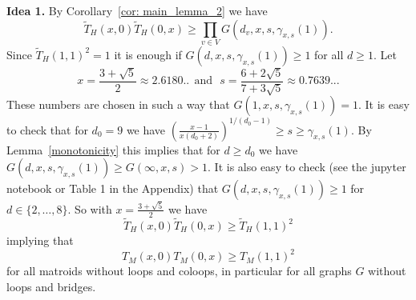 \documentclass[12pt,a4paper]{amsart}
\numberwithin{equation}{section}
\theoremstyle{plain}
\theoremstyle{definition}
\newcommand{\1}{\textbf{1}}
\begin{document}
\noindent \textbf{Idea 1.} 
By Corollary~\ref{cor: main_lemma_2} we have
$$\widetilde{T}_H(x,0)\widetilde{T}_H(0,x)\geqslant \prod_{v\in V}G(d_v,x,s,\gamma_{x,s}(1)).$$
Since $\widetilde{T}_H(1,1)^2=1$ it is enough if $G(d,x,s,\gamma_{x,s}(1))\geqslant 1$ for all $d\geqslant 1$. Let
$$x=\frac{3+\sqrt{5}}{2}\approx 2.6180..\ \ \text{and}\ \ \ s=\frac{6+2\sqrt{5}}{7+3\sqrt{5}}\approx 0.7639...$$
These numbers are chosen in such a way that
$G(1,x,s,\gamma_{x,s}(1))=1$. It is easy to check that for $d_0=9$ we have 
$\left(\frac{x-1}{x(d_0+2)}\right)^{1/(d_0-1)}\geqslant s\geqslant \gamma_{x,s}(1)$. By Lemma~\ref{monotonicity} this implies that for $d\geqslant d_0$ we have
$G(d,x,s,\gamma_{x,s}(1))\geqslant G(\infty,x,s)>1$. It is also easy to check (see the jupyter notebook or Table 1 in the Appendix) that $G(d,x,s,\gamma_{x,s}(1))\geqslant 1$ for $d\in \{2,\dots ,8\}$. 
So with $x=\frac{3+\sqrt{5}}{2}$ we have 
$$\widetilde{T}_H(x,0)\widetilde{T}_H(0,x)\geqslant \widetilde{T}_H(1,1)^2$$
implying that
$$T_M(x,0)T_M(0,x)\geqslant T_M(1,1)^2$$
for all matroids without loops and coloops, in particular 
for all graphs $G$ without loops and bridges.
\bigskip
\end{document}
